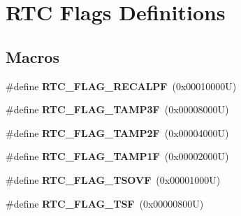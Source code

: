 \hypertarget{group___r_t_c___flags___definitions}{}\section{R\+TC Flags Definitions}
\label{group___r_t_c___flags___definitions}
\subsection*{Macros}
\begin{DoxyCompactItemize}
\item 
\mbox{\label{group___r_t_c___flags___definitions_ga01cba90a7ca51a928f72d28b6fe0d2ac}} 
\#define {\bfseries R\+T\+C\+\_\+\+F\+L\+A\+G\+\_\+\+R\+E\+C\+A\+L\+PF}~(0x00010000\+U)
\item 
\mbox{\label{group___r_t_c___flags___definitions_gab75379cd140f9c47d2761baeef4e8995}} 
\#define {\bfseries R\+T\+C\+\_\+\+F\+L\+A\+G\+\_\+\+T\+A\+M\+P3F}~(0x00008000\+U)
\item 
\mbox{\label{group___r_t_c___flags___definitions_ga5ca385acdd6a179336d4ce661dd02137}} 
\#define {\bfseries R\+T\+C\+\_\+\+F\+L\+A\+G\+\_\+\+T\+A\+M\+P2F}~(0x00004000\+U)
\item 
\mbox{\label{group___r_t_c___flags___definitions_ga3abf1af75c6ae88ddabe4b8a26634f99}} 
\#define {\bfseries R\+T\+C\+\_\+\+F\+L\+A\+G\+\_\+\+T\+A\+M\+P1F}~(0x00002000\+U)
\item 
\mbox{\label{group___r_t_c___flags___definitions_ga74656ea8ff41be61a3734dc27367e039}} 
\#define {\bfseries R\+T\+C\+\_\+\+F\+L\+A\+G\+\_\+\+T\+S\+O\+VF}~(0x00001000\+U)
\item 
\mbox{\label{group___r_t_c___flags___definitions_ga9b9ac7de7718bfe0ff77e1fd1193744b}} 
\#define {\bfseries R\+T\+C\+\_\+\+F\+L\+A\+G\+\_\+\+T\+SF}~(0x00000800\+U)
\item 
\mbox{\label{group___r_t_c___flags___definitions_gafcadab331b0193e82c7f6b037044f194}} 

\end{DoxyCompactItemize}
